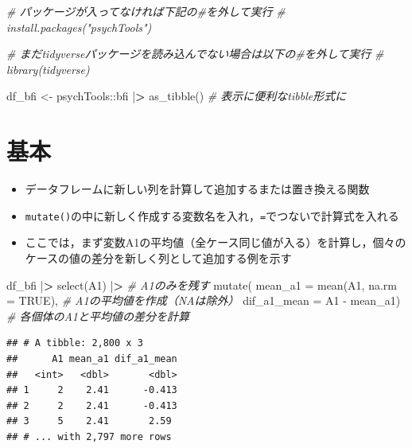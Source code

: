 \documentclass[
  xelatex,ja=standard, b5paper]{bxjsbook}
\newenvironment{Shaded}{\begin{snugshade}}{\end{snugshade}}
\newcommand{\AttributeTok}[1]{\textcolor[rgb]{0.77,0.63,0.00}{#1}}
\newcommand{\CommentTok}[1]{\textcolor[rgb]{0.56,0.35,0.01}{\textit{#1}}}
\newcommand{\ConstantTok}[1]{\textcolor[rgb]{0.00,0.00,0.00}{#1}}
\newcommand{\ErrorTok}[1]{\textcolor[rgb]{0.64,0.00,0.00}{\textbf{#1}}}
\newcommand{\FunctionTok}[1]{\textcolor[rgb]{0.00,0.00,0.00}{#1}}
\newcommand{\NormalTok}[1]{#1}
\newcommand{\OtherTok}[1]{\textcolor[rgb]{0.56,0.35,0.01}{#1}}
\newcommand{\SpecialCharTok}[1]{\textcolor[rgb]{0.00,0.00,0.00}{#1}}
\providecommand{\tightlist}{%
  \setlength{\itemsep}{0pt}\setlength{\parskip}{0pt}}
\begin{document}
\begin{Shaded}
\begin{Highlighting}[]
\CommentTok{\# パッケージが入ってなければ下記の\#を外して実行}
\CommentTok{\# install.packages("psychTools")}

\CommentTok{\# まだtidyverseパッケージを読み込んでない場合は以下の\#を外して実行}
\CommentTok{\# library(tidyverse)}

\NormalTok{df\_bfi }\OtherTok{\textless{}{-}} 
\NormalTok{  psychTools}\SpecialCharTok{::}\NormalTok{bfi }\SpecialCharTok{|}\ErrorTok{\textgreater{}} 
  \FunctionTok{as\_tibble}\NormalTok{()         }\CommentTok{\# 表示に便利なtibble形式に}
\end{Highlighting}
\end{Shaded}

\hypertarget{mu-standard}{%
\section{基本}\label{mu-standard}}

\begin{itemize}
\tightlist
\item
  データフレームに新しい列を計算して追加するまたは置き換える関数
\item
  \texttt{mutate()}の中に新しく作成する変数名を入れ，\texttt{=}でつないで計算式を入れる
\item
  ここでは，まず変数A1の平均値（全ケース同じ値が入る）を計算し，個々のケースの値の差分を新しく列として追加する例を示す
\end{itemize}

\begin{Shaded}
\begin{Highlighting}[]
\NormalTok{df\_bfi }\SpecialCharTok{|}\ErrorTok{\textgreater{}} 
  \FunctionTok{select}\NormalTok{(A1) }\SpecialCharTok{|}\ErrorTok{\textgreater{}}                      \CommentTok{\# A1のみを残す}
  \FunctionTok{mutate}\NormalTok{(}
    \AttributeTok{mean\_a1 =} \FunctionTok{mean}\NormalTok{(A1, }\AttributeTok{na.rm =} \ConstantTok{TRUE}\NormalTok{), }\CommentTok{\# A1の平均値を作成（NAは除外）}
    \AttributeTok{dif\_a1\_mean =}\NormalTok{ A1 }\SpecialCharTok{{-}}\NormalTok{ mean\_a1)       }\CommentTok{\# 各個体のA1と平均値の差分を計算}
\end{Highlighting}
\end{Shaded}

\begin{verbatim}
## # A tibble: 2,800 x 3
##      A1 mean_a1 dif_a1_mean
##   <int>   <dbl>       <dbl>
## 1     2    2.41      -0.413
## 2     2    2.41      -0.413
## 3     5    2.41       2.59 
## # ... with 2,797 more rows
\end{verbatim}
\end{document}
